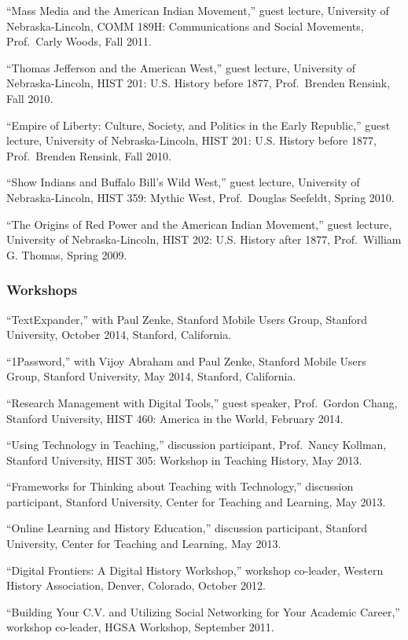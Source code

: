 ``Mass Media and the American Indian Movement,'' guest lecture,
University of Nebraska-Lincoln, COMM 189H: Communications and Social
Movements, Prof.~Carly Woods, Fall 2011.

``Thomas Jefferson and the American West,'' guest lecture, University of
Nebraska-Lincoln, HIST 201: U.S. History before 1877, Prof.~Brenden
Rensink, Fall 2010.

``Empire of Liberty: Culture, Society, and Politics in the Early
Republic,'' guest lecture, University of Nebraska-Lincoln, HIST 201:
U.S. History before 1877, Prof.~Brenden Rensink, Fall 2010.

``Show Indians and Buffalo Bill's Wild West,'' guest lecture, University
of Nebraska-Lincoln, HIST 359: Mythic West, Prof.~Douglas Seefeldt,
Spring 2010.

``The Origins of Red Power and the American Indian Movement,'' guest
lecture, University of Nebraska-Lincoln, HIST 202: U.S. History after
1877, Prof.~William G. Thomas, Spring 2009.

\subsubsection{Workshops}\label{workshops}

``TextExpander,'' with Paul Zenke, Stanford Mobile Users Group, Stanford
University, October 2014, Stanford, California.

``1Password,'' with Vijoy Abraham and Paul Zenke, Stanford Mobile Users
Group, Stanford University, May 2014, Stanford, California.

``Research Management with Digital Tools,'' guest speaker, Prof.~Gordon
Chang, Stanford University, HIST 460: America in the World, February
2014.

``Using Technology in Teaching,'' discussion participant, Prof.~Nancy
Kollman, Stanford University, HIST 305: Workshop in Teaching History,
May 2013.

``Frameworks for Thinking about Teaching with Technology,'' discussion
participant, Stanford University, Center for Teaching and Learning, May
2013.

``Online Learning and History Education,'' discussion participant,
Stanford University, Center for Teaching and Learning, May 2013.

``Digital Frontiers: A Digital History Workshop,'' workshop co-leader,
Western History Association, Denver, Colorado, October 2012.

``Building Your C.V. and Utilizing Social Networking for Your Academic
Career,'' workshop co-leader, HGSA Workshop, September 2011.


